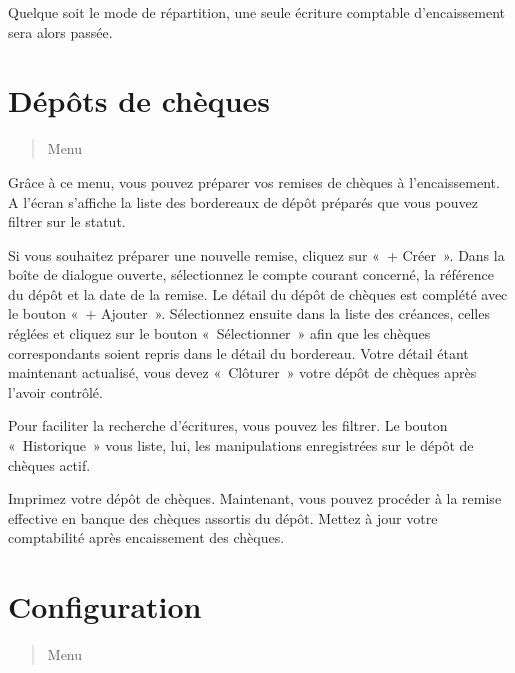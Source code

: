 \documentclass[a4paper,10pt,oneside,french]{sphinxmanual}
\begin{document}
Quelque soit le mode de répartition, une seule écriture comptable d’encaissement sera alors passée.


\section{Dépôts de chèques}
\label{\detokenize{payoff/deposit:depots-de-cheques}}\label{\detokenize{payoff/deposit::doc}}\begin{quote}

Menu 
\end{quote}

Grâce à ce menu, vous pouvez préparer vos remises de chèques à l’encaissement.
A l’écran s’affiche la liste des bordereaux de dépôt préparés que vous pouvez filtrer sur le statut.
\begin{quote}

\noindent{}
\end{quote}

Si vous souhaitez préparer une nouvelle remise, cliquez sur « + Créer ».
Dans la boîte de dialogue ouverte, sélectionnez le compte courant concerné, la référence du dépôt et la date de la remise.
Le détail du dépôt de chèques est complété avec le bouton « + Ajouter ».
Sélectionnez ensuite dans la liste des créances, celles réglées et cliquez sur le bouton « Sélectionner » afin que les chèques correspondants soient repris dans le détail du bordereau.
Votre détail étant maintenant actualisé, vous devez « Clôturer » votre dépôt de chèques après l’avoir contrôlé.

Pour faciliter la recherche d’écritures, vous pouvez les filtrer.
Le bouton « Historique » vous liste, lui, les manipulations enregistrées sur le dépôt de chèques actif.
\begin{quote}

\noindent{}
\end{quote}

Imprimez votre dépôt de chèques. Maintenant, vous pouvez procéder à la remise effective en banque des chèques assortis du dépôt.
Mettez à jour votre comptabilité après encaissement des chèques.


\section{Configuration}
\label{\detokenize{payoff/config:configuration}}\label{\detokenize{payoff/config::doc}}\begin{quote}

Menu 
\end{quote}
\end{document}
